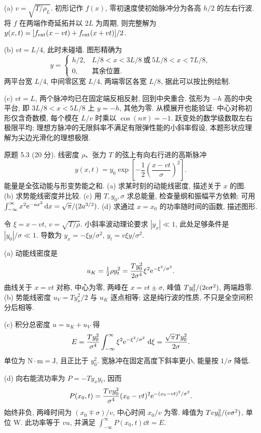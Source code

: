 \begin{solution}
(a) $v=\sqrt{T/\rho_L}$. 初形记作 $f(x)$, 零初速度使初始脉冲分为各高 $h/2$ 的左右行波. 将 $f$ 在两端作奇延拓并以 $2L$ 为周期, 则完整解为 $y(x,t)=[f_{\rm ext}(x-vt)+f_{\rm ext}(x+vt)]/2$.

(b) $vt=L/4$, 此时未碰墙. 图形精确为
\[
y=\begin{cases}h/2,&L/8<x<3L/8\ \text{或}\ 5L/8<x<7L/8,\\0,&\text{其余位置}.\end{cases}
\]
两平台宽 $L/4$, 中间零区宽 $L/4$, 两端零区各宽 $L/8$, 据此可以按比例绘制.

(c) $vt=L$, 两个脉冲均已在固定端反相反射, 回到中央重合. 弦形为 $-h$ 高的中央平台, 即 $3L/8<x<5L/8$ 上 $y=-h$, 其他为零. 从模展开也能验证: 中心对称初形仅含奇数模, 每个模在 $L/v$ 时乘以 $\cos(n\pi)=-1$. 跃变处的数学级数取左右极限平均; 理想方脉冲的无限斜率不满足有限弹性能的小斜率假设, 本题形状应理解为尖边光滑化的理想极限.
\end{solution}
\begin{exercise}\label{ps:5.3}
原题 5.3 (20 分). 线密度 $\rho$、张力 $T$ 的弦上有向右行进的高斯脉冲
\[
y(x,t)=y_0\exp\!\left[-\frac12\left(\frac{x-vt}{\sigma}\right)^2\right].
\]
能量是全弦动能与形变势能之和. (a) 求某时刻的动能线密度, 描述关于 $x$ 的图. (b) 求势能线密度并比较. (c) 用 $T,y_0,\sigma$ 求总能量, 检查量纲和振幅平方依赖; 可用 $\int_{-\infty}^\infty x^2\mathrm e^{-ax^2}\,\mathrm d x=\sqrt\pi/(2a^{3/2})$. (d) 求通过 $x=x_0$ 的功率随时间的函数, 描述图形.
\end{exercise}
\begin{solution}
令 $\xi=x-vt$, $v=\sqrt{T/\rho}$. 小斜率波动理论要求 $|y_x|\ll1$, 此处足够条件是 $|y_0|/\sigma\ll1$. 导数为 $y_x=-\xi y/\sigma^2$, $y_t=v\xi y/\sigma^2$.

(a) 动能线密度是
\[
u_K=\tfrac12\rho y_t^2=\frac{Ty_0^2}{2\sigma^4}\xi^2\mathrm e^{-\xi^2/\sigma^2}.
\]
曲线关于 $x=vt$ 对称, 中心为零, 两峰在 $x=vt\pm\sigma$, 峰值 $Ty_0^2/(2\mathrm e\sigma^2)$, 两端趋零. (b) 势能线密度 $u_V=Ty_x^2/2$ 与 $u_K$ 逐点相等; 这是纯行波的性质, 不只是全空间积分后相等.

(c) 积分总密度 $u=u_K+u_V$ 得
\[
E=\frac{Ty_0^2}{\sigma^4}\int_{-\infty}^\infty\xi^2\mathrm e^{-\xi^2/\sigma^2}\,\,\mathrm d\xi=\frac{\sqrt\pi Ty_0^2}{2\sigma}.
\]
单位为 $\mathrm N\cdot\mathrm m=\mathrm J$, 且正比于 $y_0^2$. 宽脉冲在固定高度下斜率更小, 能量按 $1/\sigma$ 降低.

(d) 向右能流功率为 $P=-Ty_xy_t$, 因而
\[
P(x_0,t)=\frac{Tvy_0^2}{\sigma^4}(x_0-vt)^2\mathrm e^{-(x_0-vt)^2/\sigma^2}.
\]
始终非负, 两峰时间为 $(x_0\mp\sigma)/v$, 中心时间 $x_0/v$ 为零. 峰值为 $Tvy_0^2/(\mathrm e\sigma^2)$, 单位 W. 此功率等于 $vu$, 并满足 $\int_{-\infty}^\infty P(x_0,t)\dd t=E$.
\end{solution}

